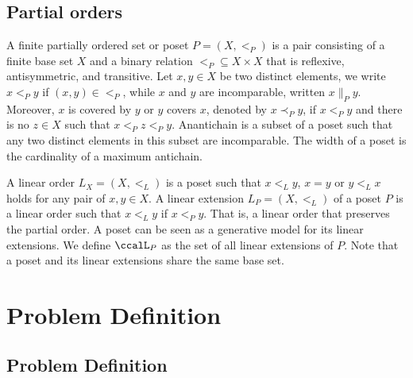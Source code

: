 \documentclass[Afour,sageh,times]{sagej}
\begin{document}
\subsection{Partial orders}\label{sec:partial}
A finite partially ordered set or poset $P = (X, <_P )$  is a pair consisting of a finite base set $X$ and a binary relation $<_P \subseteq X \times X$ that is reflexive, antisymmetric, and transitive. Let  $x, y \in X$ be two distinct elements, we write $x <_P y$ if $(x,y) \in <_P$, while $x$ and $y$ are incomparable, written $x \|_P y$. Moreover, $x$ is covered by $y$ or $y$ covers $x$, denoted by $x \prec_P y$, if $x<_P  y$ and there is no $z \in X$ such that $x  <_P  z <_P y$. Anantichain is a subset of a poset such that any two distinct elements in this subset are incomparable. The width of a poset is the cardinality of a maximum antichain. %

A linear order $L_X=(X, <_L)$ is a poset such that $x <_L y$, $x = y$ or $y <_L x$ holds for any pair of  $x, y \in X$. A linear extension  $L_P = (X, <_L)$ of a poset $P$ is a linear order such that $x <_L y$ if $x <_P y$. That is, a linear order that preserves the partial order. A poset can be seen as a generative model for its linear extensions.
We define $\ccalL_P$ as the set of all linear extensions of $P$. Note that a poset and its linear extensions share the same base set. 

\section{Problem Definition}\label{sec:problem}
 \subsection{Problem Definition}
\end{document}
